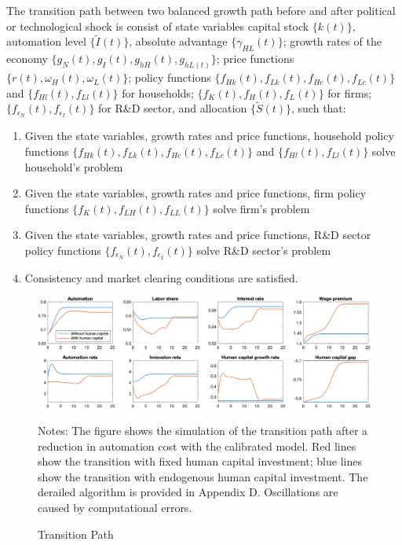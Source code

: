 \documentclass[12pt]{article}
\begin{document}
The transition path between two balanced growth path before and after political or technological shock is consist of state variables capital stock $\{k(t)\}$, automation level $\{\tilde{I}(t)\}$, absolute advantage $\{\gamma_{HL}(t)\}$; growth rates of the economy $\{g_N(t), g_I(t), g_{hH}(t),g_{hL(t)}\}$; price functions $\{r(t), \omega_H(t), \omega_L(t)\}$; policy functions $\{f_{Hk}(t), f_{Lk}(t), f_{Hc}(t), f_{Lc}(t)\}$ and $\{f_{Hl}(t), f_{Ll}(t)\}$ for households; $\{f_{K}(t), f_{H}(t), f_{L}(t)\}$ for firms; $\{f_{\epsilon_N}(t), f_{\epsilon_I}(t)\}$ for R\&D sector, and allocation $\{\tilde{S}(t)\}$, such that: 
\begin{enumerate}
\item Given the state variables, growth rates and price functions, household policy functions  $\{f_{Hk}(t), f_{Lk}(t), f_{Hc}(t), f_{Lc}(t)\}$ and $\{f_{Hl}(t), f_{Ll}(t)\}$ solve household's problem
\item Given the state variables, growth rates and price functions, firm policy functions $\{f_{K}(t), f_{LH}(t), f_{LL}(t)\}$ solve firm's problem
\item Given the state variables, growth rates and price functions, R\&D sector policy functions $\{f_{\epsilon_N}(t), f_{\epsilon_I}(t)\}$ solve  R\&D sector's problem
\item Consistency and market clearing conditions are satisfied. 
\end{enumerate}

\begin{figure}[h!]
\includegraphics[width=\textwidth]{Transition}
\caption{Transition Path}
\label{transition}
{\scriptsize Notes: The figure shows the simulation of the transition path after a reduction in automation cost with the calibrated model. Red lines show the transition with fixed human capital investment; blue lines show the transition with endogenous human capital investment. The derailed algorithm is provided in Appendix D. Oscillations are caused by computational errors.}
\end{figure}
\end{document}
